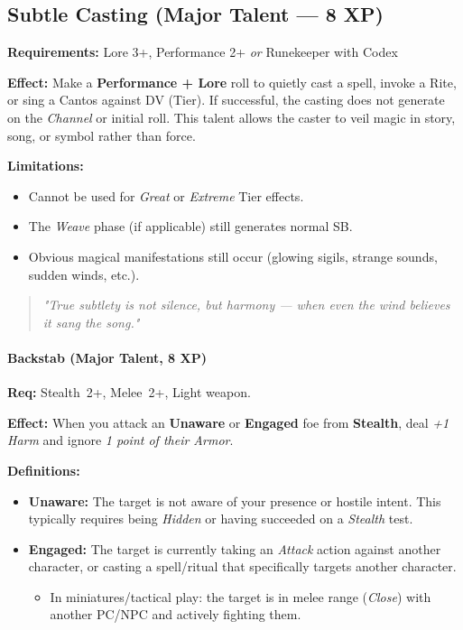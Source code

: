 \subsection*{Subtle Casting (Major Talent --- 8 XP)}

\textbf{Requirements:} Lore 3+, Performance 2+ \emph{or} Runekeeper with Codex

\textbf{Effect:} Make a \textbf{Performance + Lore} roll to quietly cast a spell, invoke a Rite, or sing a Cantos against DV (Tier). 
If successful, the casting does not generate  on the \emph{Channel} or initial roll. 
This talent allows the caster to veil magic in story, song, or symbol rather than force.

\textbf{Limitations:}
\begin{itemize}
  \item Cannot be used for \emph{Great} or \emph{Extreme} Tier effects.
  \item The \emph{Weave} phase (if applicable) still generates normal SB.
  \item Obvious magical manifestations still occur (glowing sigils, strange sounds, sudden winds, etc.).
\end{itemize}

\begin{quote}
\emph{"True subtlety is not silence, but harmony --- when even the wind believes it sang the song."}
\end{quote}


\paragraph{Backstab (Major Talent, 8 XP)} 
\textbf{Req:} Stealth~2+, Melee~2+, Light weapon.  

\textbf{Effect:} When you attack an \textbf{Unaware} or \textbf{Engaged} foe from \textbf{Stealth}, deal \emph{+1 Harm} and ignore \emph{1 point of their Armor}.  

\textbf{Definitions:}  
\begin{itemize}
  \item \textbf{Unaware:} The target is not aware of your presence or hostile intent. This typically requires being \emph{Hidden} or having succeeded on a \emph{Stealth} test.  
  \item \textbf{Engaged:} The target is currently taking an \emph{Attack} action against another character, or casting a spell/ritual that specifically targets another character.  
  \begin{itemize}
    \item In miniatures/tactical play: the target is in melee range (\emph{Close}) with another PC/NPC and actively fighting them.  
  \end{itemize}
\end{itemize}


